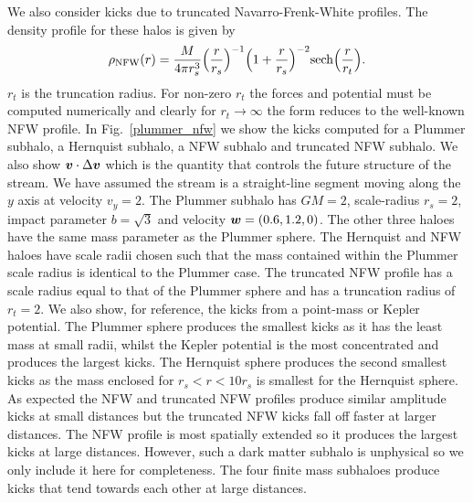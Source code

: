 \documentclass[useAMS,usenatbib,fleqn,a4paper]{mn2e}
\newcommand{\bs}[1]{\bmath{#1}}
\begin{document}
We also consider kicks due to truncated Navarro-Frenk-White profiles. The density profile for these halos is given by
\begin{equation}
\rho_{\rm NFW}(r) = \frac{M}{4\pi r_s^3}\Big(\frac{r}{r_s}\Big)^{-1}\Big(1+\frac{r}{r_s}\Big)^{-2}\mathrm{sech}\Big(\frac{r}{r_t}\Big).
\end{equation}
$r_t$ is the truncation radius. For non-zero $r_t$ the forces and potential must be computed numerically and clearly for $r_t\rightarrow\infty$ the form reduces to the well-known NFW profile. In Fig.~\ref{plummer_nfw} we show the kicks computed for a Plummer subhalo, a Hernquist subhalo, a NFW subhalo and truncated NFW subhalo. We also show $\bs{v}\cdot\Delta\bs{v}$ which is the quantity that controls the future structure of the stream. We have assumed the stream is a straight-line segment moving along the $y$ axis at velocity $v_y=2$. The Plummer subhalo has $GM=2$, scale-radius $r_s=2$, impact parameter $b=\sqrt{3}$ and velocity $\bs{w}=(0.6,1.2,0)$. The other three haloes have the same mass parameter as the Plummer sphere. The Hernquist and NFW haloes have scale radii chosen such that the mass contained within the Plummer scale radius is identical to the Plummer case. The truncated NFW profile has a scale radius equal to that of the Plummer sphere and has a truncation radius of $r_t=2$. We also show, for reference, the kicks from a point-mass or Kepler potential. The Plummer sphere produces the smallest kicks as it has the least mass at small radii, whilst the Kepler potential is the most concentrated and produces the largest kicks. The Hernquist sphere produces the second smallest kicks as the mass enclosed for $r_s<r<10r_s$ is smallest for the Hernquist sphere. As expected the NFW and truncated NFW profiles produce similar amplitude kicks at small distances but the truncated NFW kicks fall off faster at larger distances. The NFW profile is most spatially extended so it produces the largest kicks at large distances. However, such a dark matter subhalo is unphysical so we only include it here for completeness. The four finite mass subhaloes produce kicks that tend towards each other at large distances.
\end{document}
